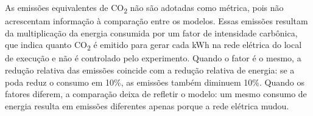 {As emissões equivalentes de CO\textsubscript{2} não são adotadas como métrica, pois não
acrescentam informação à comparação entre os modelos. Essas emissões resultam da
multiplicação da energia consumida por um fator de intensidade carbônica, que indica quanto
CO\textsubscript{2} é emitido para gerar cada kWh na rede elétrica do local de execução e
não é controlado pelo experimento. Quando o fator é o mesmo, a redução relativa das emissões
coincide com a redução relativa de energia: se a poda reduz o consumo em 10\%, as emissões
também diminuem 10\%. Quando os fatores diferem, a comparação deixa de refletir o modelo: um
mesmo consumo de energia resulta em emissões diferentes apenas porque a rede elétrica mudou.






}

